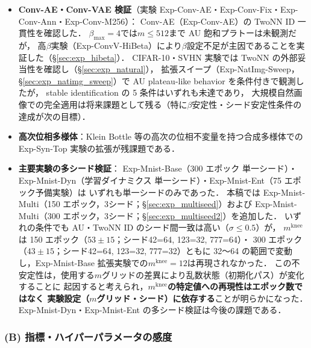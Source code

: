 \documentclass[11pt,a4paper]{jsarticle}
\newcommand{\mknee}{m^{\mathrm{knee}}}
\begin{document}
\begin{itemize}
  \item \textbf{Conv-AE・Conv-VAE 検証}（実験 Exp-Conv-AE・Exp-Conv-Fix・Exp-Conv-Ann・Exp-Conv-M256）：
        Conv-AE（Exp-Conv-AE）の TwoNN ID 一貫性を確認した．
        $\beta_{\max}=4$では$m \leq 512$まで AU 飽和プラトーは未観測だが，
        高$\beta$実験（Exp-ConvV-HiBeta）により$\beta$設定不足が主因であることを実証した（§\ref{sec:exp_hibeta}）．
        CIFAR-10・SVHN 実験では TwoNN の外部妥当性を確認し（§\ref{sec:exp_natural}），
        拡張スイープ（Exp-NatImg-Sweep，§\ref{sec:exp_natimg_sweep}）で AU plateau-like behavior を条件付きで観測したが，
        stable identification の 5 条件はいずれも未達であり，
        大規模自然画像での完全適用は将来課題として残る（特に$\beta$安定性・シード安定性条件の達成が次の目標）．
  \item \textbf{高次位相多様体}：Klein Bottle 等の高次の位相不変量を持つ合成多様体での
        Exp-Syn-Top 実験の拡張が残課題である．
  \item \textbf{主要実験の多シード検証}：
        Exp-Mnist-Base（300 エポック 単一シード）・Exp-Mnist-Dyn（学習ダイナミクス 単一シード）・Exp-Mnist-Ent（75 エポック予備実験）は
        いずれも単一シードのみであった．
        本稿では Exp-Mnist-Multi（150 エポック，3シード；§\ref{sec:exp_multiseed}）および
        Exp-Mnist-Multi（300 エポック，3シード；§\ref{sec:exp_multiseed2}）を追加した．
        いずれの条件でも AU・TwoNN ID のシード間一致は高い（$\sigma \leq 0.5$）が，
        $\mknee$は 150 エポック（$53 \pm 15$；シード42=64, 123=32, 777=64）・
        300 エポック（$43 \pm 15$；シード42=64, 123=32, 777=32）ともに
        32〜64 の範囲で変動し，Exp-Mnist-Base 拡張実験での$\mknee = 12$は再現されなかった．
        この不安定性は，使用する$m$グリッドの差異により乱数状態（初期化パス）が変化することに
        起因すると考えられ，\textbf{$\mknee$の特定値への再現性はエポック数ではなく
        実験設定（$m$グリッド・シード）に依存する}ことが明らかになった．
        Exp-Mnist-Dyn・Exp-Mnist-Ent の多シード検証は今後の課題である．
\end{itemize}

\subsubsection*{(B) 指標・ハイパーパラメータの感度}
\end{document}
